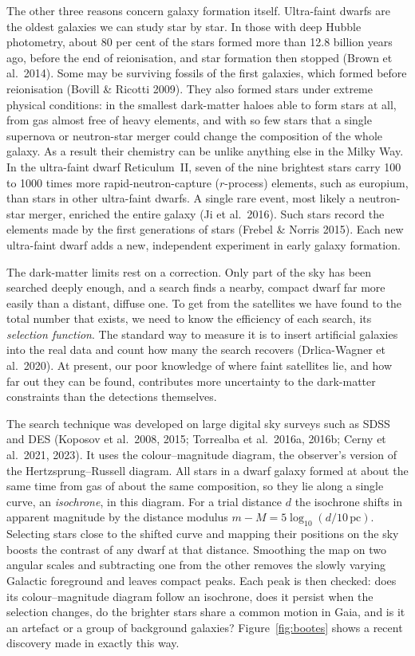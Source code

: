\documentclass[11pt,a4paper]{article}
\begin{document}
The other three reasons concern galaxy formation itself. Ultra-faint dwarfs are the oldest galaxies we can study star by star. In those with deep Hubble photometry, about 80 per cent of the stars formed more than 12.8 billion years ago, before the end of reionisation, and star formation then stopped (Brown et al.\ 2014). Some may be surviving fossils of the first galaxies, which formed before reionisation (Bovill \& Ricotti 2009). They also formed stars under extreme physical conditions: in the smallest dark-matter haloes able to form stars at all, from gas almost free of heavy elements, and with so few stars that a single supernova or neutron-star merger could change the composition of the whole galaxy. As a result their chemistry can be unlike anything else in the Milky Way. In the ultra-faint dwarf Reticulum~II, seven of the nine brightest stars carry 100 to 1000 times more rapid-neutron-capture ($r$-process) elements, such as europium, than stars in other ultra-faint dwarfs. A single rare event, most likely a neutron-star merger, enriched the entire galaxy (Ji et al.\ 2016). Such stars record the elements made by the first generations of stars (Frebel \& Norris 2015). Each new ultra-faint dwarf adds a new, independent experiment in early galaxy formation.

The dark-matter limits rest on a correction. Only part of the sky has been searched deeply enough, and a search finds a nearby, compact dwarf far more easily than a distant, diffuse one. To get from the satellites we have found to the total number that exists, we need to know the efficiency of each search, its \emph{selection function}. The standard way to measure it is to insert artificial galaxies into the real data and count how many the search recovers (Drlica-Wagner et al.\ 2020). At present, our poor knowledge of where faint satellites lie, and how far out they can be found, contributes more uncertainty to the dark-matter constraints than the detections themselves.

The search technique was developed on large digital sky surveys such as SDSS and DES (Koposov et al.\ 2008, 2015; Torrealba et al.\ 2016a, 2016b; Cerny et al.\ 2021, 2023). It uses the colour--magnitude diagram, the observer's version of the Hertzsprung--Russell diagram. All stars in a dwarf galaxy formed at about the same time from gas of about the same composition, so they lie along a single curve, an \emph{isochrone}, in this diagram. For a trial distance $d$ the isochrone shifts in apparent magnitude by the distance modulus $m - M = 5\log_{10}(d/10\,\mathrm{pc})$. Selecting stars close to the shifted curve and mapping their positions on the sky boosts the contrast of any dwarf at that distance. Smoothing the map on two angular scales and subtracting one from the other removes the slowly varying Galactic foreground and leaves compact peaks. Each peak is then checked: does its colour--magnitude diagram follow an isochrone, does it persist when the selection changes, do the brighter stars share a common motion in Gaia, and is it an artefact or a group of background galaxies? Figure~\ref{fig:bootes} shows a recent discovery made in exactly this way.
\end{document}
